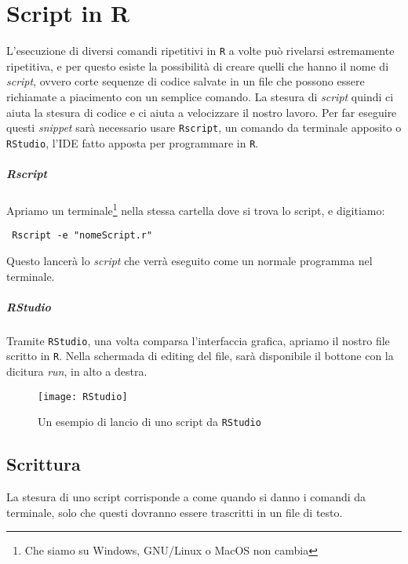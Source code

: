 \chapter{Script in R}

L'esecuzione di diversi comandi ripetitivi in \texttt{R} a volte può rivelarsi 
estremamente ripetitiva, e per questo esiste la possibilità di creare quelli che 
hanno il nome di \textit{script}, ovvero corte sequenze di codice salvate in un 
file che possono essere richiamate a piacimento con un semplice comando.
La stesura di \textit{script} quindi ci aiuta la stesura di codice e ci aiuta a 
velocizzare il nostro lavoro. Per far eseguire questi \textit{snippet} sarà 
necessario usare \texttt{Rscript}, un comando da terminale apposito o 
\texttt{RStudio}, l'IDE fatto apposta per programmare in \texttt{R}.

\paragraph*{Rscript} Apriamo un terminale\footnote{Che siamo su Windows, 
GNU/Linux o MacOS non cambia} nella stessa cartella dove si trova lo script, e 
digitiamo:
\begin{lstlisting}
 Rscript -e "nomeScript.r"
\end{lstlisting}
Questo lancerà lo \textit{script} che verrà eseguito come un normale programma 
nel terminale.

\paragraph*{RStudio} Tramite \texttt{RStudio}, una volta comparsa l'interfaccia 
grafica, apriamo il nostro file scritto in \texttt{R}. Nella schermada di 
editing del file, sarà disponibile il bottone con la dicitura \textit{run}, in 
alto a destra.

\begin{figure}[h]
  \centering
  \texttt{[image: RStudio]}
  \caption{Un esempio di lancio di uno script da \texttt{RStudio}}
\end{figure}

\section{Scrittura}

La stesura di uno script corrisponde a come quando si danno i comandi da 
terminale, solo che questi dovranno essere trascritti in un file di testo.
